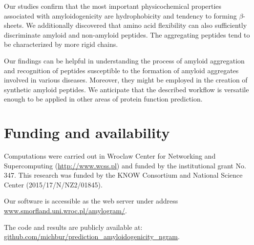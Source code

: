 \documentclass[fleqn,10pt,twoside]{gcb15submission}
\begin{document}
Our studies confirm that the most important physicochemical properties associated 
with amyloidogenicity are hydrophobicity and tendency to forming $\beta$-sheets.  
We additionally discovered that amino acid flexibility can also sufficiently 
discriminate amyloid and non-amyloid peptides. The aggregating peptides tend to
be characterized by more rigid chains.  

Our findings can be helpful in understanding the process of amyloid aggregation 
and recognition of peptides susceptible to the formation of amyloid aggregates involved 
in various diseases. Moreover, they might be employed in the creation of synthetic 
amyloid peptides. We anticipate that the described workflow is versatile enough to 
be applied in other areas of protein function prediction.


\section*{Funding and availability}

Computations were carried out in Wroclaw Center for Networking 
and Supercomputing (\url{http://www.wcss.pl}) and funded by the
institutional grant No. 347. This research was funded by the KNOW Consortium and
National Science Center (2015/17/N/NZ2/01845).

Our software is accessible as the web server under address 
\url{www.smorfland.uni.wroc.pl/amylogram/}.

The code and results are publicly available at: \url{github.com/michbur/prediction_amyloidogenicity_ngram}.


\end{document}
